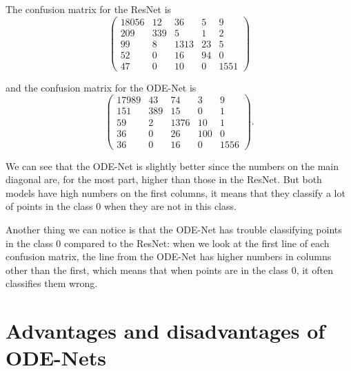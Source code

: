 \documentclass[10pt,a4paper]{article}
\theoremstyle{definition}
\theoremstyle{plain}
\begin{document}
The confusion matrix for the ResNet is
$$
\begin{pmatrix}
18056 & 12 & 36 & 5 & 9 \\
209 & 339 & 5 & 1 & 2 \\
99 & 8 & 1313 & 23 & 5 \\
52 & 0 & 16 & 94 & 0 \\
47 & 0 & 10 & 0 & 1551
\end{pmatrix}
$$

and the confusion matrix for the ODE-Net is
$$
\begin{pmatrix}
17989 & 43 & 74 & 3 & 9 \\
151 & 389 & 15 & 0 & 1 \\
59 & 2 & 1376 & 10 & 1 \\
36 & 0 & 26 & 100 & 0 \\
36 & 0 & 16 & 0 & 1556
\end{pmatrix}.
$$

We can see that the ODE-Net is slightly better since the numbers on the main diagonal are, for the most part, higher than those in the ResNet. But both models have high numbers on the first columns, it means that they classify a lot of points in the class $0$ when they are not in this class.

Another thing we can notice is that the ODE-Net has trouble classifying points in the class $0$ compared to the ResNet: when we look at the first line of each confusion matrix, the line from the ODE-Net has higher numbers in columns other than the first, which means that when points are in the class $0$, it often classifies them wrong.

\section{Advantages and disadvantages of ODE-Nets}
\end{document}
